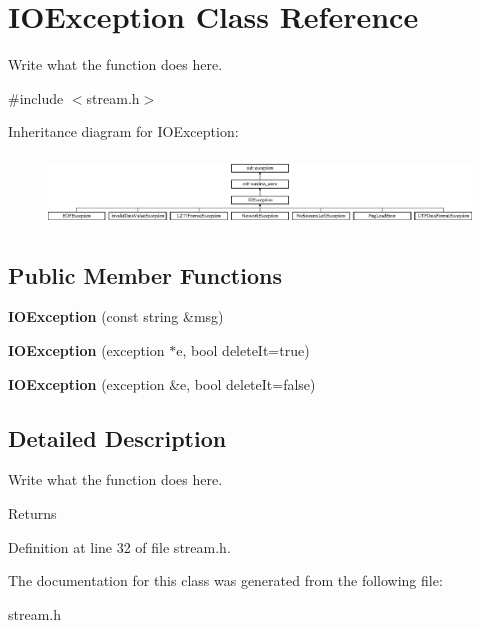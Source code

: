 \hypertarget{classIOException}{\section{I\+O\+Exception Class Reference}
\label{classIOException}
}


Write what the function does here.  




{\ttfamily \#include $<$stream.\+h$>$}

Inheritance diagram for I\+O\+Exception\+:\begin{figure}[H]
\begin{center}
\leavevmode
\includegraphics[height=1.871345cm]{classIOException}
\end{center}
\end{figure}
\subsection*{Public Member Functions}
\begin{DoxyCompactItemize}
\item 
\hypertarget{classIOException_a73fcf78b1b5820aa158680e896f0b983}{{\bfseries I\+O\+Exception} (const string \&msg)}\label{classIOException_a73fcf78b1b5820aa158680e896f0b983}

\item 
\hypertarget{classIOException_a286c271ca82812d1e7c12925acf33d14}{{\bfseries I\+O\+Exception} (exception $\ast$e, bool delete\+It=true)}\label{classIOException_a286c271ca82812d1e7c12925acf33d14}

\item 
\hypertarget{classIOException_abf6ec1a6297e0558758ef144e9e36471}{{\bfseries I\+O\+Exception} (exception \&e, bool delete\+It=false)}\label{classIOException_abf6ec1a6297e0558758ef144e9e36471}

\end{DoxyCompactItemize}


\subsection{Detailed Description}
Write what the function does here. 

\begin{DoxyReturn}{Returns}

\end{DoxyReturn}


Definition at line 32 of file stream.\+h.



The documentation for this class was generated from the following file\+:\begin{DoxyCompactItemize}
\item 
stream.\+h\end{DoxyCompactItemize}
